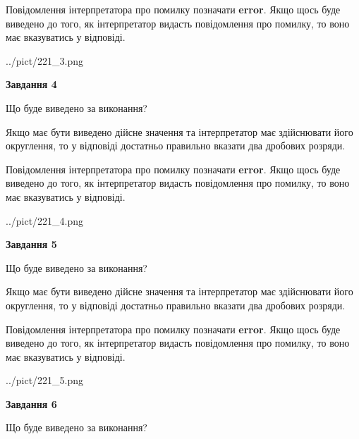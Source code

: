\documentclass[12pt, ukrainian]{article}
\begin{document}
{\begin {Large}
Повідомлення інтерпретатора про помилку позначати \textbf{error}.
Якщо щось буде виведено до того, як інтерпретатор видасть повідомлення про помилку, 
то воно має вказуватись у відповіді. \par

\begin{center}
	{../pict/221_3.png}
\end{center}
\newpage

{\begin {center}\textbf{Завдання 4}\end {center}}\par
Що буде виведено за виконання? \par

Якщо має бути виведено дійсне значення та інтерпретатор має здійснювати його округлення, 
то у відповіді достатньо правильно вказати два дробових розряди.

Повідомлення інтерпретатора про помилку позначати \textbf{error}.
Якщо щось буде виведено до того, як інтерпретатор видасть повідомлення про помилку, 
то воно має вказуватись у відповіді. \par

\begin{center}
	{../pict/221_4.png}
\end{center}
\newpage

{\begin {center}\textbf{Завдання 5}\end {center}}\par
Що буде виведено за виконання? \par

Якщо має бути виведено дійсне значення та інтерпретатор має здійснювати його округлення, 
то у відповіді достатньо правильно вказати два дробових розряди.

Повідомлення інтерпретатора про помилку позначати \textbf{error}.
Якщо щось буде виведено до того, як інтерпретатор видасть повідомлення про помилку, 
то воно має вказуватись у відповіді. \par

\begin{center}
	{../pict/221_5.png}
\end{center}
\newpage

{\begin {center}\textbf{Завдання 6}\end {center}}\par
Що буде виведено за виконання? \par


\end{Large}}
\end{document}
